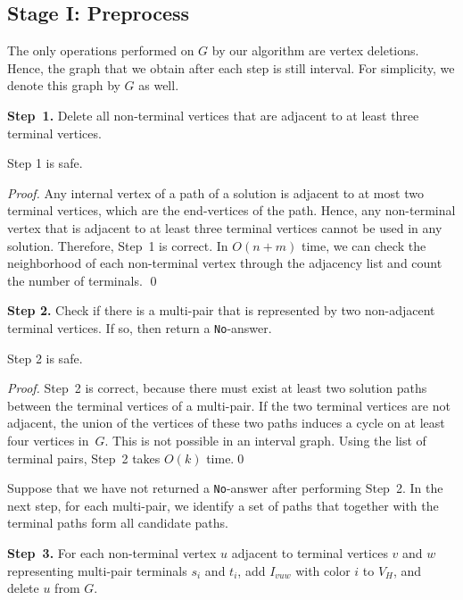 \documentclass{llncs}
\begin{document}
\subsection{Stage I: Preprocess}
The only operations performed on $G$ by our algorithm are vertex deletions. Hence, the graph that we obtain after each step is still interval. For simplicity, we denote this graph by $G$ as well. 

\medskip
\noindent
{\bf Step~1.} Delete all non-terminal vertices that are adjacent to at least three terminal vertices. 

\begin{lemma}\label{l-1}
Step 1 is safe.
\end{lemma}

\begin{proof}
Any internal vertex of a path of a solution is adjacent to at most two terminal vertices, which are the end-vertices of the path. Hence, any non-terminal vertex that is adjacent to at least three terminal vertices  cannot be used in any solution. Therefore, Step~1 is correct. In $O(n+m)$ time, we can check the neighborhood of each non-terminal vertex through the adjacency list and count the number of terminals.
\qed
\end{proof}

\medskip
\noindent
{\bf Step 2.} Check if there is a multi-pair that is represented by two non-adjacent terminal vertices. If so, then return a \texttt{No}-answer.

\begin{lemma}\label{l-2}
Step 2 is safe.
\end{lemma}

\begin{proof}
Step~2 is correct, because there must exist at least two solution paths between the terminal vertices of a multi-pair. If the two terminal vertices are not adjacent, the union of the vertices of these two paths induces a cycle on at least four vertices in~$G$. This is not possible in an interval graph.
Using the list of terminal pairs, Step~2 takes $O(k)$ time.\qed
\end{proof}

Suppose that we have not returned a \texttt{No}-answer after performing Step~2.
In the next step, for each multi-pair, we identify a set of paths that together with the terminal paths form all candidate paths.

\medskip
\noindent
{\bf Step~3.} For each non-terminal vertex $u$  adjacent to terminal vertices $v$ and $w$  representing multi-pair terminals $s_i$ and $t_i$, add $I_{vuw}$ with color $i$ to $V_{H}$, and delete $u$ from $G$.
\end{document}
